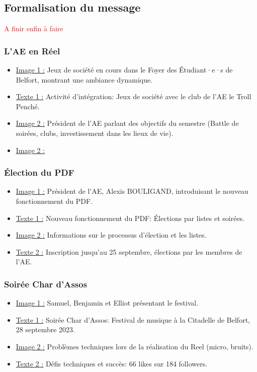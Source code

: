 
\subsection{Formalisation du message}\label{subsec:formalisation-du-message}

\textcolor{red}{A finir enfin à faire}

\subsubsection{L'AE en Réel}
\begin{itemize}
    \item \underline{Image 1 :} Jeux de société en cours dans le Foyer des Étudiant·e·s de Belfort, montrant une ambiance dynamique.
    \item \underline{Texte 1 :} \og Activité d'intégration: Jeux de société avec le club de l'AE le Troll Penché. \fg{}
    \item \underline{Image 2 :} Président de l'AE parlant des objectifs du semestre (Battle de soirées, clubs, investissement dans les lieux de vie).
    \item \underline{Image 2 :}
\end{itemize}

\subsubsection{Élection du PDF}
\begin{itemize}
    \item \underline{Image 1 :} Président de l'AE, Alexis BOULIGAND, introduisant le nouveau fonctionnement du PDF.
    \item \underline{Texte 1 :} \og Nouveau fonctionnement du PDF: Élections par listes et soirées. \fg{}
    \item \underline{Image 2 :} Informations sur le processus d'élection et les listes.
    \item \underline{Texte 2 :} \og Inscription jusqu'au 25 septembre, élections par les membres de l'AE. \fg{}
\end{itemize}

\subsubsection{Soirée Char d’Assos}
\begin{itemize}
    \item \underline{Image 1 :} Samuel, Benjamin et Elliot présentant le festival.
    \item \underline{Texte 1 :} \og Soirée Char d’Assos: Festival de musique à la Citadelle de Belfort, 28 septembre 2023. \fg{}
    \item \underline{Image 2 :} Problèmes techniques lors de la réalisation du Reel (micro, bruits).
    \item \underline{Texte 2 :} \og Défis techniques et succès: 66 likes sur 184 followers. \fg{}
\end{itemize}

